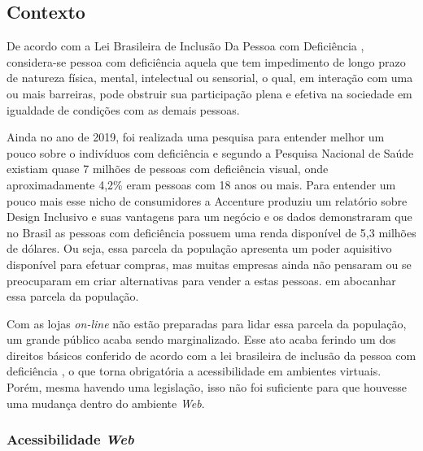 \subsection{Contexto}
{

De acordo com a  Lei Brasileira de Inclusão Da Pessoa com Deficiência \cite{brasil2015}, 
considera-se pessoa com deficiência aquela que tem impedimento de longo prazo de natureza física, mental, intelectual ou sensorial, o qual, em interação com uma ou mais barreiras, pode obstruir sua participação plena e efetiva na sociedade em igualdade de condições com as demais pessoas.

Ainda no ano de 2019, foi realizada uma pesquisa para entender melhor um pouco sobre o indivíduos com deficiência e segundo a Pesquisa Nacional de Saúde \cite{PNS} existiam quase 7 milhões de pessoas com deficiência visual, onde aproximadamente 4,2\% eram pessoas com 18 anos ou mais. Para entender um pouco mais esse nicho de consumidores a Accenture produziu um relatório \cite{ACCENTURE} sobre Design Inclusivo \cite{INCLUSIVE-DESIGN} e suas vantagens para um negócio e os dados demonstraram que no Brasil as pessoas com deficiência possuem uma renda disponível de 5,3 milhões de dólares. Ou seja, essa parcela da população apresenta um poder aquisitivo disponível para efetuar compras, mas muitas empresas ainda não pensaram ou se preocuparam em criar alternativas para vender a estas pessoas. em abocanhar essa parcela da população.  

Com as lojas \textit{on-line} não estão preparadas para lidar essa parcela da população, um grande público acaba sendo marginalizado. Esse ato acaba ferindo um dos direitos básicos conferido de acordo com a lei brasileira de inclusão da pessoa com deficiência \cite{brasil2015}, o que torna obrigatória a acessibilidade em ambientes virtuais. Porém, mesma havendo uma legislação, isso não foi suficiente para que houvesse uma mudança dentro do ambiente \textit{\textit{Web}}. 

 \subsubsection{Acessibilidade \textit{\textit{Web}}}
 
}
